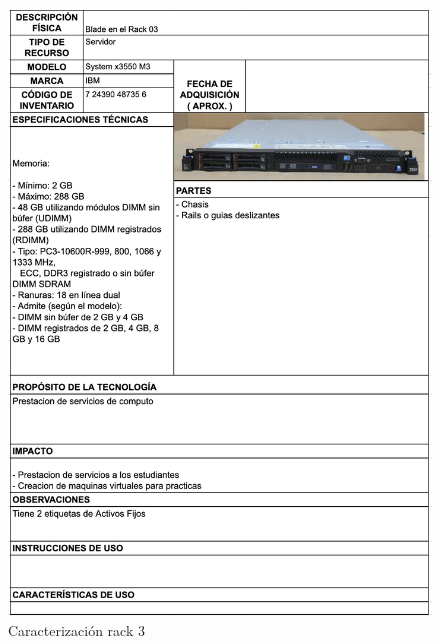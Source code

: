 \begin{figure}[H]
    \centering
    \includegraphics[width=\textwidth] {tablas-images/cp1/racks/rack-3.png}
    \caption{Caracterización rack 3}\label{fig:rack-3}
\end{figure}


